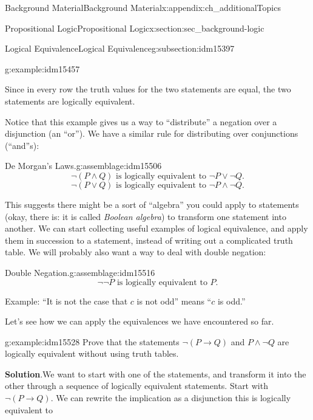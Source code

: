 \documentclass[oneside,10pt,]{book}
\numberwithin{equation}{chapter}
\def\imp{\rightarrow}
\begin{document}
\begin{appendixptx}{Background Material}{}{Background Material}{}{}{x:appendix:ch_additionalTopics}
\begin{sectionptx}{Propositional Logic}{}{Propositional Logic}{}{}{x:section:sec_background-logic}
\begin{subsectionptx}{Logical Equivalence}{}{Logical Equivalence}{}{}{g:subsection:idm15397}
\begin{example}{}{g:example:idm15457}
\begin{sidebyside}{1}{0}{0}{0}
\begin{sbspanel}{1}
{\par}
\end{sbspanel}%
\end{sidebyside}%
\par
Since in every row the truth values for the two statements are equal, the two statements are logically equivalent.%
\end{example}
Notice that this example gives us a way to ``distribute'' a negation over a disjunction (an ``or''). We have a similar rule for distributing over conjunctions (``and''s):%
\begin{assemblage}{De Morgan's Laws.}{g:assemblage:idm15506}%
%
\begin{equation*}
\neg(P \wedge Q) \text{ is logically equivalent to } \neg P \vee \neg Q.
\end{equation*}
%
\begin{equation*}
\neg(P \vee Q) \text{ is logically equivalent to } \neg P \wedge \neg Q.
\end{equation*}
%
\end{assemblage}
This suggests there might be a sort of ``algebra'' you could apply to statements (okay, there is: it is called \emph{Boolean algebra}) to transform one statement into another. We can start collecting useful examples of logical equivalence, and apply them in succession to a statement, instead of writing out a complicated truth table. We will probably also want a way to deal with double negation:%
\begin{assemblage}{Double Negation.}{g:assemblage:idm15516}%
%
\begin{equation*}
\neg \neg P \mbox{ is logically equivalent to } P.
\end{equation*}
%
\par
Example: ``It is not the case that \(c\) is not odd'' means ``\(c\) is odd.''%
\end{assemblage}
Let's see how we can apply the equivalences we have encountered so far.%
\begin{example}{}{g:example:idm15528}%
Prove that the statements \(\neg(P \imp Q)\) and \(P\wedge \neg Q\) are logically equivalent without using truth tables.%
\par\smallskip%
\noindent\textbf{Solution}.\hypertarget{g:solution:idm15533}{}\quad{}We want to start with one of the statements, and transform it into the other through a sequence of logically equivalent statements. Start with \(\neg(P \imp Q)\). We can rewrite the implication as a disjunction this is logically equivalent to%

\end{example}
\end{subsectionptx}
\end{sectionptx}
\end{appendixptx}
\end{document}
